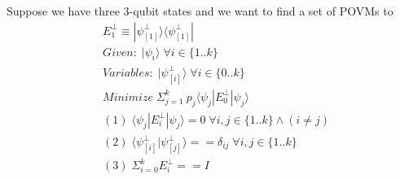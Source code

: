 \documentclass[11pt]{article}
\theoremstyle{definition}
\begin{document}
Suppose we have three 3-qubit states and we want to find a set of POVMs to
\begin{align*}
     & E^{\perp}_{1} \equiv |\psi^{\perp}_{[1]} \rangle \langle \psi^{\perp}_{[1]} |                                   \\
     & Given: \; |\psi_{i} \rangle \; \forall i \in \{ 1 .. k \}                                                       \\
     & Variables: \; |\psi^{\perp}_{[i]} \rangle \; \forall i \in \{ 0 .. k \}                                         \\
     & Minimize \; \Sigma_{j=1}^{k} \: p_{j} \langle \psi_{j}|  E^{\perp}_{0} |\psi_{j} \rangle                        \\
     & (1) \; \langle \psi_{j}|  E^{\perp}_{i} |\psi_{j} \rangle = 0 \; \forall i, j \in \{ 1 .. k \} \land (i \neq j) \\
     & (2) \; \langle \psi^{\perp}_{[i]} |\psi^{\perp}_{[j]} \rangle  == \delta_{ij} \; \forall i, j \in \{ 1 .. k \}  \\
     & (3) \; \Sigma_{i=0}^{k} E^{\perp}_{i} == I                                                                      \\
\end{align*}
\end{document}
